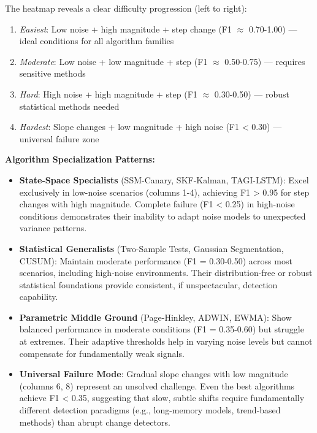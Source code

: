 \documentclass[journal,article,submit,pdftex,moreauthors]{Definitions/mdpi}
\begin{document}
The heatmap reveals a clear difficulty progression (left to right):
\begin{enumerate}
    \item \textit{Easiest}: Low noise + high magnitude + step change (F1 $\approx$ 0.70-1.00) — ideal conditions for all algorithm families
    \item \textit{Moderate}: Low noise + low magnitude + step (F1 $\approx$ 0.50-0.75) — requires sensitive methods
    \item \textit{Hard}: High noise + high magnitude + step (F1 $\approx$ 0.30-0.50) — robust statistical methods needed
    \item \textit{Hardest}: Slope changes + low magnitude + high noise (F1 < 0.30) — universal failure zone
\end{enumerate}

\textbf{Algorithm Specialization Patterns:}

\begin{itemize}
    \item \textbf{State-Space Specialists} (SSM-Canary, SKF-Kalman, TAGI-LSTM): Excel exclusively in low-noise scenarios (columns 1-4), achieving F1 > 0.95 for step changes with high magnitude. Complete failure (F1 < 0.25) in high-noise conditions demonstrates their inability to adapt noise models to unexpected variance patterns.
    
    \item \textbf{Statistical Generalists} (Two-Sample Tests, Gaussian Segmentation, CUSUM): Maintain moderate performance (F1 = 0.30-0.50) across most scenarios, including high-noise environments. Their distribution-free or robust statistical foundations provide consistent, if unspectacular, detection capability.
    
    \item \textbf{Parametric Middle Ground} (Page-Hinkley, ADWIN, EWMA): Show balanced performance in moderate conditions (F1 = 0.35-0.60) but struggle at extremes. Their adaptive thresholds help in varying noise levels but cannot compensate for fundamentally weak signals.
    
    \item \textbf{Universal Failure Mode}: Gradual slope changes with low magnitude (columns 6, 8) represent an unsolved challenge. Even the best algorithms achieve F1 < 0.35, suggesting that slow, subtle shifts require fundamentally different detection paradigms (e.g., long-memory models, trend-based methods) than abrupt change detectors.
\end{itemize}
\end{document}
